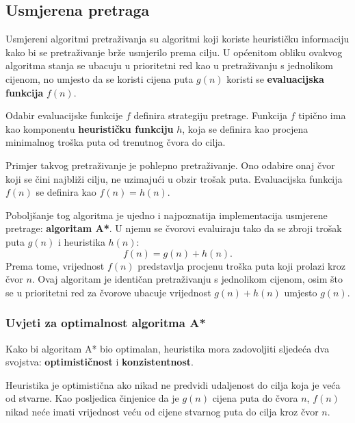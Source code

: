 \documentclass[times, utf8, zavrsni, numeric]{fer}
\begin{document}
\subsection{Usmjerena pretraga}

\par Usmjereni algoritmi pretraživanja su algoritmi koji koriste heurističku informaciju kako bi se pretraživanje brže usmjerilo prema cilju.
U općenitom obliku ovakvog algoritma stanja se ubacuju u prioritetni red kao u pretraživanju s jednolikom cijenom, no umjesto da se koristi cijena puta \(g(n)\) koristi se \textbf{evaluacijska funkcija} \(f(n)\).

\par Odabir evaluacijske funkcije \(f\) definira strategiju pretrage. 
Funkcija \(f\) tipično ima kao komponentu \textbf{heurističku funkciju} \(h\), koja se definira kao procjena minimalnog troška puta od trenutnog čvora do cilja\cite{book:AIModernApproach}.

\par Primjer takvog pretraživanje je pohlepno pretraživanje. 
Ono odabire onaj čvor koji se čini najbliži cilju, ne uzimajući u obzir trošak puta.
Evaluacijska funkcija \(f(n)\) se definira kao \(f(n) = h(n)\).

\par Poboljšanje tog algoritma je ujedno i najpoznatija implementacija usmjerene pretrage: \textbf{algoritam A*}. 
U njemu se čvorovi evaluiraju tako da se zbroji trošak puta \(g(n)\) i heuristika \(h(n)\): 
\[f(n) = g(n) + h(n).\]
Prema tome, vrijednost \(f(n)\) predstavlja procjenu troška puta koji prolazi kroz čvor \(n\).
Ovaj algoritam je identičan pretraživanju s jednolikom cijenom, osim što se u prioritetni red za čvorove ubacuje vrijednost \(g(n) + h(n)\) umjesto \(g(n)\).

\subsubsection{Uvjeti za optimalnost algoritma A*}
Kako bi algoritam A* bio optimalan, heuristika mora zadovoljiti sljedeća dva svojstva: \textbf{optimističnost} i \textbf{konzistentnost}.

\par Heuristika je optimistična ako nikad ne predvidi udaljenost do cilja koja je veća od stvarne. 
Kao posljedica činjenice da je \(g(n)\) cijena puta do čvora \(n\), \(f(n)\) nikad neće imati vrijednost veću od cijene stvarnog puta do cilja kroz čvor \(n\).
\end{document}
